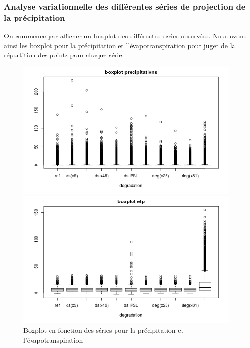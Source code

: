 \documentclass[a4paper,11pt]{article}
\numberwithin{equation}{section}
\begin{document}
\subsubsection{Analyse variationnelle des différentes séries de projection de la précipitation}
\label{ch:analyse variationnelle}
On commence par afficher un boxplot des différentes séries observées. Nous avons ainsi les boxplot pour la précipitation et l'évapotranspiration pour juger de la répartition des points pour chaque série.

\begin{figure}[H]
	\begin{minipage}[b]{0.48\linewidth}
		\centering \includegraphics[scale=0.4]{images/boxplot_precip.png}
	\end{minipage}\hfill
	\begin{minipage}[b]{0.48\linewidth}	
		\centering \includegraphics[scale=0.4]{images/boxplot_evap.png}
	\end{minipage}
	\caption{Boxplot en fonction des séries pour la précipitation et l'évapotranspiration}
\end{figure} 
\end{document}
